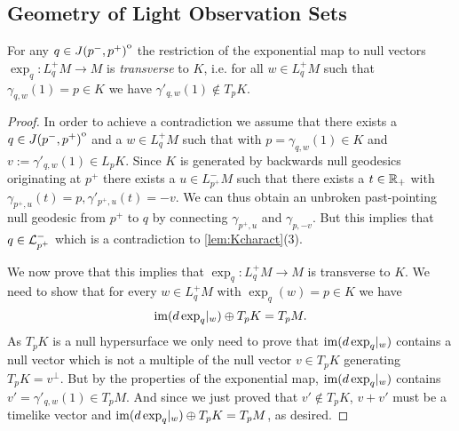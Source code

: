 \subsection{Geometry of Light Observation Sets}


\begin{lemma}\label{lem:transversality}
For any $q\in {\kern0ptJ(p^-,p^+)}^{\mathrm{o}}$ the restriction of the exponential map to null vectors $\exp_q:L^+_qM\to M$ is \emph{transverse} to $K$, i.e. for all $w\in L^+_qM$ such that $\gamma_{q,w}(1) = p\in K$ we have $\gamma'_{q,w}(1)\notin T_pK$.
\end{lemma}
\begin{proof}
    In order to achieve a contradiction we assume that there exists a $q\in {\kern0ptJ(p^-,p^+)}^{\mathrm{o}}$ and a $w\in L^+_qM$ such that with $p=\gamma_{q,w}(1)\in K$ and $v:=\gamma'_{q,w}(1)\in L_pK$.
    Since $K$ is generated by backwards null geodesics originating at $p^+$ there exists a $u\in L^-_{p^+}M$ such that there exists a $t\in \mathbb{R}_+$ with $\gamma_{p^+,u}(t)=p, \gamma'_{p^+,u}(t)=-v$. We can thus obtain an unbroken past-pointing null geodesic from $p^+$ to $q$ by connecting $\gamma_{p^+,u}$ and $\gamma_{p,-v}$. But this implies that $q\in {\mathcal{L}}^-_{p^+}$ which is a contradiction to \ref{lem:Kcharact}(3).

    We now prove that this implies that $\exp_q:L^+_qM\to M$ is transverse to $K$. We need to show that for every $w\in L^+_qM$ with $\exp_q(w)=p\in K$ we have 
    \[
        \operatorname{im}(d\exp_q\rvert_w) \oplus T_pK = T_pM.
    \]
    As $T_pK$ is a null hypersurface we only need to prove that $\operatorname{im}(d\exp_q\rvert_w)$ contains a null vector which is not a multiple of the null vector $v\in T_pK$ generating $T_pK = v^\perp$. But by the properties of the exponential map, $\operatorname{im}(d\exp_q\rvert_w)$ contains $v' = \gamma'_{q,w}(1) \in T_pM$. And since we just proved that $v'\notin T_pK$, $v+v'$ must be a timelike vector and $\operatorname{im}(d\exp_q\rvert_w) \oplus T_pK = T_pM$, as desired.
\end{proof}


